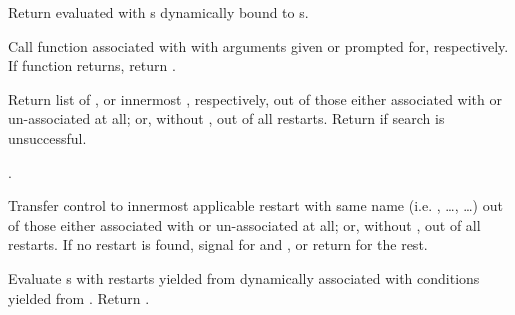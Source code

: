 \begin{LIST}{1cm}
  {
  Return  evaluated with s 
  dynamically bound to s.
  }

  {
  Call function associated with  with arguments given or
  prompted for, respectively. If  function returns, return .
  }

  {
  Return list of , or innermost 
  , respectively, out of those either associated
  with  or un-associated at all; or, without
  , out of all restarts. Return \retval{\NIL} if search
  is unsuccessful.
  }

  {
  .
  }

  {
  Transfer control to innermost applicable restart with same name
  (i.e. , \ldots,  \ldots) out of those either associated
  with  or un-associated at all; or, without
  , out of all restarts. If no restart is found,
  signal  for  and ,
  or return \retval{\NIL} for the rest.
  }

  {
  Evaluate s with restarts yielded from 
  dynamically associated with conditions yielded from
  . Return .
  }


\end{LIST}
